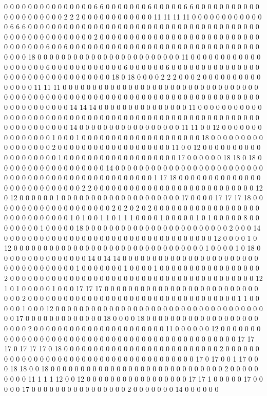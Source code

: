 0 0 0 0 0 0 0 0 0 0 0 0 0 0 0 6 6 0 0 0 0 0 0 0 6 0 0 0 0 0 6 6 0 0 0 0 0 0 0 0 0 0 0 0 0 0 0 0 0 0 0 0 0 2 2 2 0 0 0 0 0 0 0 0 0 0 0 0 11 11 11 11 0 0 0 0 0 0 0 0 0 0 0 0 0 6 6 6 0 0 0 0 0 0 0 0 0 0 0 0 0 0 0 0 0 0 0 0 0 0 0 0 0 0 0 0 0 0 0 0 0 0 0 0 0 0 0 0 0 0 0 0 0 0 0 0 0 0 0 0 0 0 2 0 0 0 0 0 0 0 0 0 0 0 0 0 0 0 0 0 0 0 0 0 0 0 0 0 0 0 0 0 0 0 0 0 0 6 0 0 6 0 0 0 0 0 0 0 0 0 0 0 0 0 0 0 0 0 0 0 0 0 0 0 0 0 0 0 0 0 0 0 0 0 0 0 0 18 0 0 0 0 0 0 0 0 0 0 0 0 0 0 0 0 0 0 0 0 0 0 0 0 11 0 0 0 0 0 0 0 0 0 0 0 0 0 0 0 0 0 0 0 6 0 0 0 0 0 0 0 0 0 0 0 0 6 0 0 0 0 0 0 6 0 0 0 0 0 0 0 0 0 0 0 0 0 0 0 0 0 0 0 0 0 0 0 0 0 0 0 0 0 0 0 0 0 18 0 18 0 0 0 0 2 2 2 0 0 0 2 0 0 0 0 0 0 0 0 0 0 0 0 0 0 0 11 11 11 0 0 0 0 0 0 0 0 0 0 0 0 0 0 0 0 0 0 0 0 0 0 0 0 0 0 0 0 0 0 0 0 0 0 0 0 0 0 0 0 0 0 0 0 0 0 0 0 0 0 0 0 0 0 0 0 0 0 0 0 0 0 0 0 0 0 0 0 0 0 0 0 0 0 0 0 0 0 0 0 0 0 0 0 0 0 0 14 14 14 0 0 0 0 0 0 0 0 0 0 0 0 0 0 0 11 0 0 0 0 0 0 0 0 0 0 0 0 0 0 0 0 0 0 0 0 0 0 0 0 0 0 0 0 0 0 0 0 0 0 0 0 0 0 0 0 0 0 0 0 0 0 0 0 0 0 0 0 0 0 0 0 0 0 0 0 0 0 0 0 0 14 0 0 0 0 0 0 0 0 0 0 0 0 0 0 0 0 0 11 11 0 0 12 0 0 0 0 0 0 0 0 0 0 0 0 0 0 0 1 0 0 0 1 0 0 0 0 0 0 0 0 0 0 0 0 0 0 0 0 0 0 0 0 18 0 0 0 0 0 0 0 0 0 0 0 0 0 0 0 0 0 2 0 0 0 0 0 0 0 0 0 0 0 0 0 0 0 0 0 0 0 11 0 0 12 0 0 0 0 0 0 0 0 0 0 0 0 0 0 0 0 0 0 0 1 0 0 0 0 0 0 0 0 0 0 0 0 0 0 0 0 0 0 0 17 0 0 0 0 0 0 18 18 0 18 0 0 0 0 0 0 0 0 0 0 0 0 0 0 0 0 0 0 14 0 0 0 0 0 0 0 0 0 0 0 0 0 0 0 0 0 0 0 0 0 0 0 0 0 0 0 0 0 0 0 0 0 0 0 0 0 0 0 0 0 0 0 0 0 0 0 0 0 0 1 17 18 0 0 0 0 0 0 0 0 0 0 0 0 0 0 0 0 0 0 0 0 0 0 0 0 0 0 0 2 2 0 0 0 0 0 0 0 0 0 0 0 0 0 0 0 0 0 0 0 0 0 0 0 0 0 0 0 12 0 12 0 0 0 0 0 0 1 0 0 0 0 0 0 0 0 0 0 0 0 0 0 0 0 0 0 0 0 17 0 0 0 0 17 17 17 18 0 0 0 0 0 0 0 0 0 0 0 0 0 0 0 0 0 0 0 0 2 0 2 0 2 0 2 0 0 0 0 0 0 0 0 0 0 0 0 0 0 0 0 0 0 0 0 0 0 0 0 0 0 0 0 0 1 0 1 0 0 1 1 0 1 1 1 0 0 0 0 1 0 0 0 0 0 1 0 1 0 0 0 0 0 8 0 0 0 0 0 0 0 0 1 0 0 0 0 0 18 0 0 0 0 0 0 0 0 0 0 0 0 0 0 0 0 0 0 0 0 0 0 0 0 2 0 0 0 14 0 0 0 0 0 0 0 0 0 0 0 0 0 0 0 0 0 0 0 0 0 0 0 0 0 0 0 0 0 0 0 0 0 0 0 12 0 0 0 0 1 0 12 0 0 0 0 0 0 0 0 0 0 0 0 0 0 0 0 0 0 0 0 0 0 0 0 0 0 0 0 0 0 0 0 1 0 0 0 0 1 0 18 0 0 0 0 0 0 0 0 0 0 0 0 0 0 0 14 0 14 14 0 0 0 0 0 0 0 0 0 0 0 0 0 0 0 0 0 0 0 0 0 0 0 0 0 0 0 0 0 0 0 0 0 0 0 1 0 0 0 0 0 0 0 1 0 0 0 0 1 0 0 0 0 0 0 0 0 0 0 0 0 0 0 0 0 0 2 0 0 0 0 0 0 0 0 0 0 0 0 0 0 0 0 0 0 0 0 0 0 0 0 0 0 0 0 0 0 0 0 0 0 0 0 0 0 0 0 0 12 1 0 1 0 0 0 0 0 1 0 0 0 17 17 17 0 0 0 0 0 0 0 0 0 0 0 0 0 0 0 0 0 0 0 0 0 0 0 0 0 0 0 0 0 2 0 0 0 0 0 0 0 0 0 0 0 0 0 0 0 0 0 0 0 0 0 0 0 0 0 0 0 0 0 0 0 0 0 0 0 1 1 0 0 0 0 0 1 0 0 0 12 0 0 0 0 0 0 0 0 0 0 0 0 0 0 0 0 0 0 0 0 0 0 0 0 0 0 0 0 0 0 0 0 0 0 0 0 0 17 0 0 0 0 0 0 0 0 0 0 0 0 0 18 0 0 0 0 18 0 0 0 0 0 0 0 0 0 0 0 0 0 0 0 0 0 0 0 0 0 0 0 2 0 0 0 0 0 0 0 0 0 0 0 0 0 0 0 0 0 0 0 0 0 0 11 0 0 0 0 0 0 12 0 0 0 0 0 0 0 0 0 0 0 0 0 0 0 0 0 0 0 0 0 0 0 0 0 0 0 0 0 0 0 0 0 0 0 0 0 0 0 0 0 0 0 0 0 0 17 17 17 0 17 17 17 0 18 0 0 0 0 0 0 0 0 0 0 0 0 0 0 0 0 0 0 0 0 0 0 0 0 0 0 2 0 0 0 0 0 0 0 0 0 0 0 0 0 0 0 0 0 0 0 0 0 0 0 0 0 0 0 0 0 0 0 0 0 0 0 0 0 0 17 0 17 0 0 1 17 0 0 0 18 18 0 0 18 0 0 0 0 0 0 0 0 0 0 0 0 0 0 0 0 0 0 0 0 0 0 0 0 0 0 0 0 0 2 0 0 0 0 0 0 0 0 0 11 1 1 1 12 0 0 12 0 0 0 0 0 0 0 0 0 0 0 0 0 0 0 0 0 17 17 1 0 0 0 0 0 17 0 0 0 0 0 17 0 0 0 0 0 0 0 0 0 0 0 0 0 0 0 0 2 0 0 0 0 0 0 0 14 0 0 0 0 0 0 